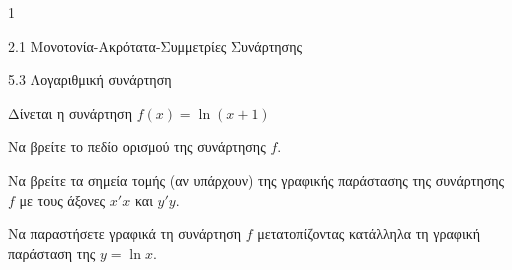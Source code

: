 \begin{ylh}{1}
\item 2.1 Μονοτονία-Ακρότατα-Συμμετρίες Συνάρτησης
\item 5.3 Λογαριθμική συνάρτηση
\end{ylh}
Δίνεται η συνάρτηση $f(x) = \ln(x + 1)$
\begin{alist}
\item Να βρείτε το πεδίο ορισμού της συνάρτησης $f$.
\item Να βρείτε τα σημεία τομής (αν υπάρχουν) της γραφικής παράστασης της συνάρτησης $f$ με τους άξονες $x'x$ και $y'y$.
\item Να παραστήσετε γραφικά τη συνάρτηση $f$ μετατοπίζοντας κατάλληλα τη γραφική παράσταση της $y = \ln x$.
\end{alist}

